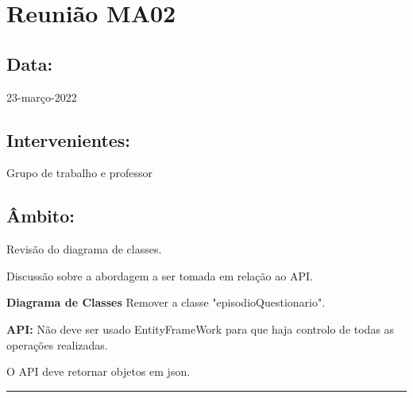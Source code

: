 \section{Reunião MA02}\label{reuniaoMA02}

\subsection*{Data:}
23-março-2022

\subsection*{Intervenientes:}
Grupo de trabalho e professor

\subsection*{Âmbito:}
Revisão do diagrama de classes.

Discussão sobre a abordagem a ser tomada em relação ao API.

\textbf{Diagrama de Classes}
Remover a classe "episodioQuestionario".


\textbf{API:}
Não deve ser usado EntityFrameWork para que haja controlo de todas as operações realizadas.

O API deve retornar objetos em json.

\noindent \rule{\linewidth}{0.4pt}
\newline
